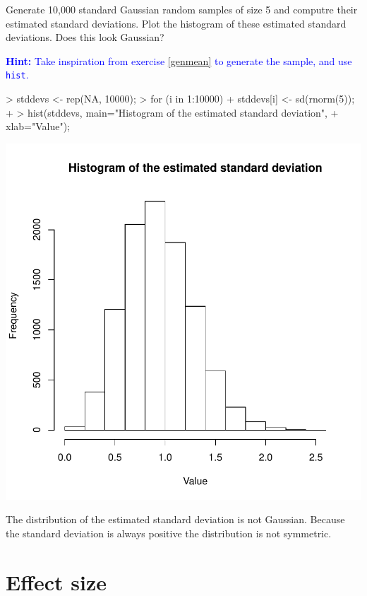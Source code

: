 \documentclass[a4paper]{article}
\theoremstyle{definition}
\begin{document}
\begin{Exercise}
Generate 10,000 standard Gaussian random samples of size 5 and
computre their estimated standard deviations. Plot the histogram of
these estimated standard deviations. Does this look Gaussian?
\par\noindent\textcolor{Blue}{\textbf{Hint:} Take inspiration from
exercise \ref{genmean} to generate the sample, and use \texttt{hist}.}
\end{Exercise}
\begin{Answer}
\begin{Schunk}
\begin{Sinput}
> stddevs <- rep(NA, 10000);
> for (i in 1:10000) {
+    stddevs[i] <- sd(rnorm(5));
+ }
> hist(stddevs, main="Histogram of the estimated standard deviation",
+    xlab="Value");
\end{Sinput}
\end{Schunk}
\includegraphics{ttest-009}
\par
The distribution of the estimated standard deviation is not Gaussian.
Because the standard deviation is always positive the distribution is
not symmetric.
\end{Answer}


\section{Effect size}
\end{document}
